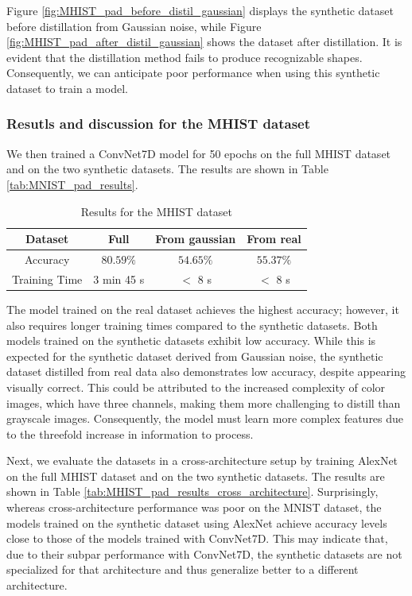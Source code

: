 \documentclass[onecolumn]{IEEEtran}
\begin{document}
Figure \ref{fig:MHIST_pad_before_distil_gaussian} displays the synthetic dataset before distillation from Gaussian noise, while Figure \ref{fig:MHIST_pad_after_distil_gaussian} shows the dataset after distillation. It is evident that the distillation method fails to produce recognizable shapes. Consequently, we can anticipate poor performance when using this synthetic dataset to train a model.
\\
\subsubsection{Resutls and discussion for the MHIST dataset}
\label{sec:MHIST_results_2}
We then trained a ConvNet7D model for 50 epochs on the full MHIST dataset and on the two synthetic datasets. The results are shown in Table \ref{tab:MNIST_pad_results}.

\begin{table}[H]
    \centering
    \begin{tabular}{|c|c|c|c|}
        \hline
        Dataset & Full & From gaussian & From real \\
        \hline
        Accuracy & $80.59\%$ & $54.65\%$ & $55.37\%$ \\
        \hline
        Training Time & 3 min 45 s & $<$ 8 s & $<$ 8 s \\
        \hline
    \end{tabular}
    \caption{Results for the MHIST dataset}
    \label{tab:MHIST_pad_results}
\end{table}

The model trained on the real dataset achieves the highest accuracy; however, it also requires longer training times compared to the synthetic datasets. Both models trained on the synthetic datasets exhibit low accuracy. While this is expected for the synthetic dataset derived from Gaussian noise, the synthetic dataset distilled from real data also demonstrates low accuracy, despite appearing visually correct. This could be attributed to the increased complexity of color images, which have three channels, making them more challenging to distill than grayscale images. Consequently, the model must learn more complex features due to the threefold increase in information to process.

Next, we evaluate the datasets in a cross-architecture setup by training AlexNet on the full MHIST dataset and on the two synthetic datasets. The results are shown in Table \ref{tab:MHIST_pad_results_cross_architecture}. Surprisingly, whereas cross-architecture performance was poor on the MNIST dataset, the models trained on the synthetic dataset using AlexNet achieve accuracy levels close to those of the models trained with ConvNet7D. This may indicate that, due to their subpar performance with ConvNet7D, the synthetic datasets are not specialized for that architecture and thus generalize better to a different architecture.
\end{document}
